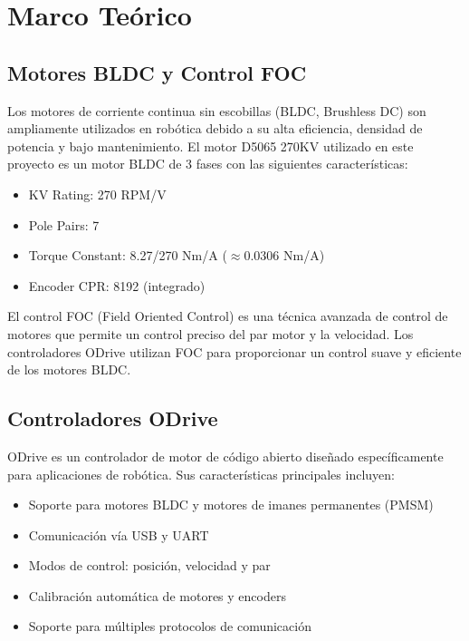 \chapter{Marco Teórico}

\section{Motores BLDC y Control FOC}

Los motores de corriente continua sin escobillas (BLDC, Brushless DC) son ampliamente utilizados en robótica debido a su alta eficiencia, densidad de potencia y bajo mantenimiento. El motor D5065 270KV utilizado en este proyecto es un motor BLDC de 3 fases con las siguientes características:

\begin{itemize}
    \item KV Rating: 270 RPM/V
    \item Pole Pairs: 7
    \item Torque Constant: 8.27/270 Nm/A ($\approx$0.0306 Nm/A)
    \item Encoder CPR: 8192 (integrado)
\end{itemize}

El control FOC (Field Oriented Control) es una técnica avanzada de control de motores que permite un control preciso del par motor y la velocidad. Los controladores ODrive utilizan FOC para proporcionar un control suave y eficiente de los motores BLDC.

\section{Controladores ODrive}

ODrive es un controlador de motor de código abierto diseñado específicamente para aplicaciones de robótica. Sus características principales incluyen:

\begin{itemize}
    \item Soporte para motores BLDC y motores de imanes permanentes (PMSM)
    \item Comunicación vía USB y UART
    \item Modos de control: posición, velocidad y par
    \item Calibración automática de motores y encoders
    \item Soporte para múltiples protocolos de comunicación
\end{itemize}

